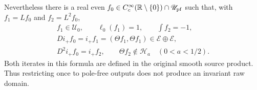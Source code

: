 Nevertheless there is a real even
\(f_0\in C_c^\infty(\mathbb R\setminus\{0\})\cap
\mathscr U_{\rm pf}\) such that, with \(f_1=Lf_0\) and
\(f_2=L^2f_0\),
\[
 \begin{gathered}
 f_1\in\mathscr U_0,\qquad \ell_0(f_1)=1,
                          \qquad \int f_2=-1,\\
 D i_+f_0=i_+f_1=(\Theta f_1,\Theta f_1)
                                     \in\mathcal E\oplus\mathcal E,\\
 D^2 i_+f_0=i_+f_2,\qquad
                         \Theta f_2\notin\mathcal H_a
                                     \quad(0<a<1/2).
 \end{gathered}
 \tag{MA-MO.90}
\]
Both iterates in this formula are defined in the original smooth
source product. Thus restricting once to pole-free outputs does not
produce an invariant raw domain.

